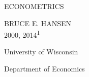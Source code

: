 \begin{center}
ECONOMETRICS

BRUCE E. HANSEN\\
\textcopyright{}2000, 2014\textsuperscript{1}

University of Wisconsin

Department of Economics
\end{center}